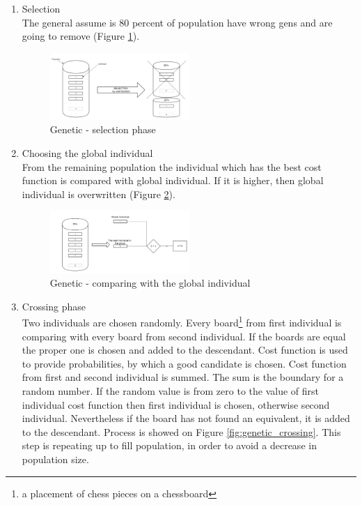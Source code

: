 \documentclass[pdftex]{article}
\begin{document}
\begin{enumerate}
 	\item Selection \hfill \\
		The general assume is 80 percent of population have wrong gens and are going to remove (Figure \ref{fig:genetic_selection}).
		
\begin{figure}[!htb]
	\centering
	\includegraphics[width=0.5\textwidth]{genetic/genetic_selection.png} 
	\caption{Genetic - selection phase}
	\label{fig:genetic_selection}
\end{figure}

	\item Choosing the global individual \hfill \\
		From the remaining population the individual which has the best cost function is compared with global individual. If it is higher, then global individual is overwritten (Figure \ref{fig:genetic_global}).

\begin{figure}[!htb]
	\centering
	\includegraphics[width=0.5\textwidth]{genetic/genetic_global.png} 
	\caption{Genetic - comparing with the global individual}
	\label{fig:genetic_global}
\end{figure}
\newpage
	\item Crossing phase \hfill \\
		Two individuals are chosen randomly. Every board\footnote{a placement of chess pieces on a chessboard} from first individual is comparing with every board from second individual. If the boards are equal the proper one is chosen and added to the descendant. Cost function is used to provide probabilities, by which a good candidate is chosen. Cost function from first and second individual is summed. The sum is the boundary for a random number. If the random value is from zero to the value of first individual cost function then first individual is chosen, otherwise second individual. Nevertheless if the board has not found an equivalent, it is added to the descendant. Process is showed on Figure \ref{fig:genetic_crossing}. This step is repeating up to fill population, in order to avoid a decrease in population size.

\end{enumerate}
\end{document}
